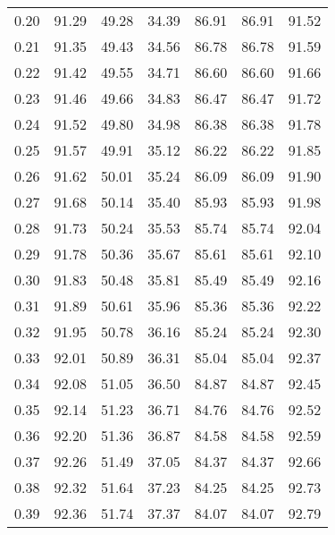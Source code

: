 \begin{tabular}{|c|c|c|c|c|c|c|}
      0.20 &     91.29 &     49.28 &      34.39 &   86.91 &      86.91 &         91.52 \\
      0.21 &     91.35 &     49.43 &      34.56 &   86.78 &      86.78 &         91.59 \\
      0.22 &     91.42 &     49.55 &      34.71 &   86.60 &      86.60 &         91.66 \\
      0.23 &     91.46 &     49.66 &      34.83 &   86.47 &      86.47 &         91.72 \\
      0.24 &     91.52 &     49.80 &      34.98 &   86.38 &      86.38 &         91.78 \\
      0.25 &     91.57 &     49.91 &      35.12 &   86.22 &      86.22 &         91.85 \\
      0.26 &     91.62 &     50.01 &      35.24 &   86.09 &      86.09 &         91.90 \\
      0.27 &     91.68 &     50.14 &      35.40 &   85.93 &      85.93 &         91.98 \\
      0.28 &     91.73 &     50.24 &      35.53 &   85.74 &      85.74 &         92.04 \\
      0.29 &     91.78 &     50.36 &      35.67 &   85.61 &      85.61 &         92.10 \\
      0.30 &     91.83 &     50.48 &      35.81 &   85.49 &      85.49 &         92.16 \\
      0.31 &     91.89 &     50.61 &      35.96 &   85.36 &      85.36 &         92.22 \\
      0.32 &     91.95 &     50.78 &      36.16 &   85.24 &      85.24 &         92.30 \\
      0.33 &     92.01 &     50.89 &      36.31 &   85.04 &      85.04 &         92.37 \\
      0.34 &     92.08 &     51.05 &      36.50 &   84.87 &      84.87 &         92.45 \\
      0.35 &     92.14 &     51.23 &      36.71 &   84.76 &      84.76 &         92.52 \\
      0.36 &     92.20 &     51.36 &      36.87 &   84.58 &      84.58 &         92.59 \\
      0.37 &     92.26 &     51.49 &      37.05 &   84.37 &      84.37 &         92.66 \\
      0.38 &     92.32 &     51.64 &      37.23 &   84.25 &      84.25 &         92.73 \\
      0.39 &     92.36 &     51.74 &      37.37 &   84.07 &      84.07 &         92.79 \\

\end{tabular}
